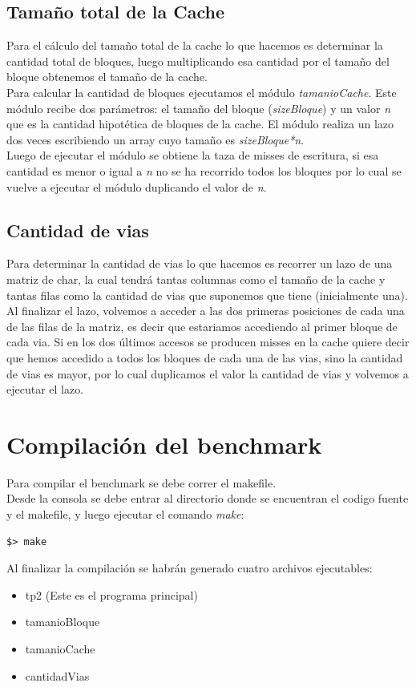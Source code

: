 \documentclass[a4paper,10pt]{article}
\begin{document}
\subsection{Tama\~no total de la Cache}
Para el c\'alculo del tama\~no total de la cache lo que hacemos es determinar la cantidad total de bloques, luego multiplicando
esa cantidad por el tama\~no del bloque obtenemos el tama\~no de la cache.\\
Para calcular la cantidad de bloques ejecutamos el m\'odulo \textit{tamanioCache}. Este m\'odulo recibe dos par\'ametros: el tama\~no del bloque (\textit{sizeBloque}) y un valor \textit{n} que es la cantidad hipot\'etica de bloques de la cache. El m\'odulo realiza un lazo dos veces escribiendo un array cuyo tama\~no es \textit{sizeBloque*n}.\\
Luego de ejecutar el m\'odulo se obtiene la taza de misses de escritura, si esa cantidad es menor o igual a \textit{n} no se ha recorrido todos los bloques por lo cual se vuelve a ejecutar el m\'odulo duplicando el valor de \textit{n}.

\subsection{Cantidad de vias}
Para determinar la cantidad de vias lo que hacemos es recorrer un lazo de una matriz de char, la cual tendr\'a tantas columnas como el tama\~no de la cache y tantas filas como la cantidad de vias que suponemos que tiene (inicialmente una).\\
Al finalizar el lazo, volvemos a acceder a las dos primeras posiciones de cada una de las filas de la matriz, es decir que estariamos accediendo al primer bloque de cada via. Si en los dos \'ultimos accesos se producen misses en la cache quiere decir que hemos accedido a todos los bloques de cada una de las vias, sino la cantidad de vias es mayor, por lo cual duplicamos el valor la cantidad de vias y volvemos a ejecutar el lazo.

\section{Compilaci\'on del benchmark}
Para compilar el benchmark se debe correr el makefile.\\
Desde la consola se debe entrar al directorio donde se encuentran el codigo fuente y el makefile, y luego ejecutar el comando \textit{make}:
\begin{verbatim}
$> make
\end{verbatim}
Al finalizar la compilaci\'on se habr\'an generado cuatro archivos ejecutables:\\
\begin{itemize}
 \item tp2 (Este es el programa principal)
 \item tamanioBloque
 \item tamanioCache
 \item cantidadVias
\end{itemize}
\end{document}
